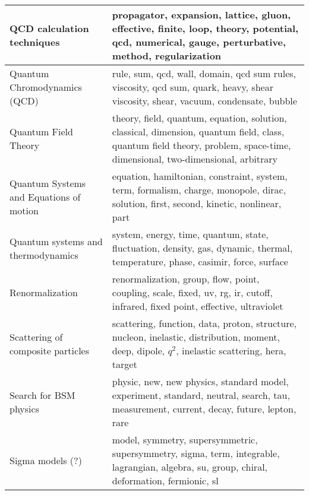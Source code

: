 \begin{longtable}[H]{p{}|p{}}
QCD calculation techniques                            &                                                             propagator, expansion, lattice, gluon, effective, finite, loop, theory, potential, qcd, numerical, gauge, perturbative, method, regularization \\ \midrule
Quantum Chromodynamics (QCD)                          &                                                                          rule, sum, qcd, wall, domain, qcd sum rules, viscosity, qcd sum, quark, heavy, shear viscosity, shear, vacuum, condensate, bubble \\ \midrule
Quantum Field Theory                                  &                                 theory, field, quantum, equation, solution, classical, dimension, quantum field, class, quantum field theory, problem, space-time, dimensional, two-dimensional, arbitrary \\ \midrule
Quantum Systems and Equations of motion               &                                                                     equation, hamiltonian, constraint, system, term, formalism, charge, monopole, dirac, solution, first, second, kinetic, nonlinear, part \\ \midrule
Quantum systems and thermodynamics                    &                                                                             system, energy, time, quantum, state, fluctuation, density, gas, dynamic, thermal, temperature, phase, casimir, force, surface \\ \midrule
Renormalization                                       &                                                                             renormalization, group, flow, point, coupling, scale, fixed, uv, rg, ir, cutoff, infrared, fixed point, effective, ultraviolet \\ \midrule
Scattering of composite particles                     &                                                           scattering, function, data, proton, structure, nucleon, inelastic, distribution, moment, deep, dipole, $q^2$, inelastic scattering, hera, target \\ \midrule
Search for BSM physics                                &                                                                    physic, new, new physics, standard model, experiment, standard, neutral, search, tau, measurement, current, decay, future, lepton, rare \\ \midrule
Sigma models (?)                                      &                                                                model, symmetry, supersymmetric, supersymmetry, sigma, term, integrable, lagrangian, algebra, su, group, chiral, deformation, fermionic, sl \\ \midrule

\end{longtable}
